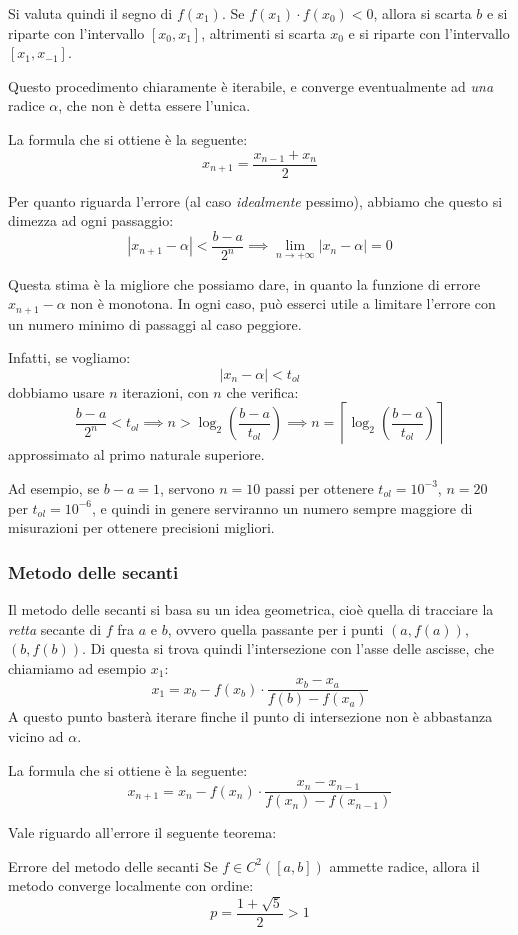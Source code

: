 \documentclass[a4paper,11pt]{article}
\begin{document}
Si valuta quindi il segno di $f(x_1)$.
Se $f(x_1) \cdot f(x_0) < 0$, allora si scarta $b$ e si riparte con l'intervallo $[x_0, x_1]$, altrimenti si scarta $x_0$ e si riparte con l'intervallo $[x_1, x_{-1}]$.

Questo procedimento chiaramente è iterabile, e converge eventualmente ad \textit{una} radice $\alpha$, che non è detta essere l'unica.

La formula che si ottiene è la seguente:
$$
x_{n + 1} = \frac{x_{n - 1} + x_n}{2} 
$$

Per quanto riguarda l'errore (al caso \textit{idealmente} pessimo), abbiamo che questo si dimezza ad ogni passaggio:
$$
| x_{n + 1} - \alpha| < \frac{b - a}{2^n} \implies \lim_{n \rightarrow +\infty} |x_n - \alpha| = 0
$$

Questa stima è la migliore che possiamo dare, in quanto la funzione di errore $x_{n + 1} - \alpha$ non è monotona.
In ogni caso, può esserci utile a limitare l'errore con un numero minimo di passaggi al caso peggiore.

Infatti, se vogliamo:
$$
|x_n - \alpha| < t_{ol}
$$
dobbiamo usare $n$ iterazioni, con $n$ che verifica:
$$
\frac{b - a}{2^n} < t_{ol} \implies n > \log_2 \left( \frac{b - a}{t_{ol}} \right) \implies n = \left\lceil \log_2 \left( \frac{b - a}{t_{ol}} \right) \right\rceil
$$
approssimato al primo naturale superiore.

Ad esempio, se $b - a = 1$, servono $n = 10$ passi per ottenere $t_{ol} = 10^{-3}$, $n = 20$ per $t_{ol} = 10^{-6}$, e quindi in genere serviranno un numero sempre maggiore di misurazioni per ottenere precisioni migliori.

\subsubsection{Metodo delle secanti}
Il metodo delle secanti si basa su un idea geometrica, cioè quella di tracciare la \textit{retta} secante di $f$ fra $a$ e $b$, ovvero quella passante per i punti $(a, f(a))$, $(b, f(b))$.
Di questa si trova quindi l'intersezione con l'asse delle ascisse, che chiamiamo ad esempio $x_1$:
$$
x_1 = x_b - f(x_b) \cdot \frac{x_b - x_a}{f(b) - f(x_{a})}
$$
A questo punto basterà iterare finche il punto di intersezione non è abbastanza vicino ad $\alpha$.

La formula che si ottiene è la seguente:
$$
x_{n + 1} = x_n - f(x_n) \cdot \frac{x_n - x_{n - 1}}{f(x_n) - f(x_{n - 1})}
$$

Vale riguardo all'errore il seguente teorema:
\begin{theorem}{Errore del metodo delle secanti}
	Se $f \in C^2([a, b])$ ammette radice, allora il metodo converge  localmente con ordine:
	$$
		p = \frac{1 + \sqrt{5}}{2} > 1
	$$
\end{theorem}
\end{document}
